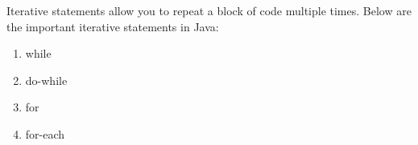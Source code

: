 \setlength{\columnsep}{3pt}
\begin{flushleft}
	
	Iterative statements allow you to repeat a block of code multiple times. 
	\newline
	Below are the important iterative statements in Java:
	\begin{enumerate}
		\item while
		\item do-while
		\item for
		\item for-each
	\end{enumerate}
	
	
\end{flushleft}


